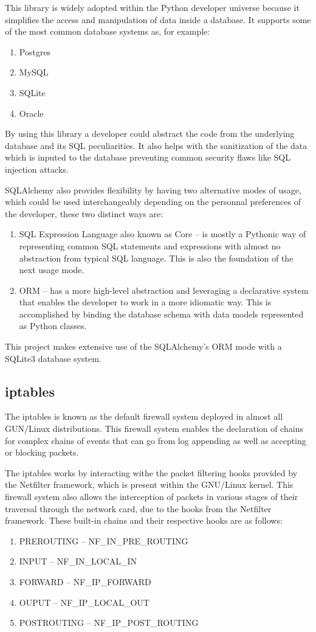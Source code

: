 This library is widely adopted within the Python developer universe because it
simplifies the access and manipulation of data inside a database. It supports
some of the most common database systems as, for example:
\begin{enumerate}
	\item Postgres
	\item MySQL
	\item SQLite
	\item Oracle
\end{enumerate}
By using this library a developer could abstract the code from the underlying
database and its SQL peculiarities. It also helps with the sanitization of the
data which is inputed to the database preventing common security flaws like SQL
injection attacks.

SQLAlchemy also provides flexibility by having two alternative modes of usage,
which could be used interchangeably depending on the personnal preferences of
the developer, these two distinct ways are:
\begin{enumerate}
	\item SQL Expression Language also known as Core -- is mostly a Pythonic way
		of representing common SQL statements and expressions with almost no
		abstraction from typical SQL language. This is also the foundation of
		the next usage mode.
	\item ORM -- has a more high-level abstraction and leveraging a declarative
		system that enables the developer to work in a more idiomatic way. This
		is accomplished by binding the database schema with data models
		represented as Python classes.
\end{enumerate}

This project makes extensive use of the SQLAlchemy's ORM mode with a SQLite3
database system.

\subsection{iptables}
\label{chap3:sec:tools:sub:iptables}
The iptables is known as the default firewall system deployed in almost all
GUN/Linux distributions. This firewall system enables the declaration of chains
for complex chains of events that can go from log appending as well as accepting
or blocking packets.

The iptables works by interacting withe the packet filtering hooks provided by
the Netfilter framework, which is present within the GNU/Linux kernel.
This firewall system also allows the interception of packets in various stages
of their traversal through the network card, due to the hooks from the Netfilter
framework. These built-in chains and their
respective hooks are as follows:
\begin{enumerate}
	\item PREROUTING -- NF\_IN\_PRE\_ROUTING
	\item INPUT -- NF\_IN\_LOCAL\_IN
	\item FORWARD -- NF\_IP\_FORWARD
	\item OUPUT -- NF\_IP\_LOCAL\_OUT
	\item POSTROUTING -- NF\_IP\_POST\_ROUTING
\end{enumerate}

